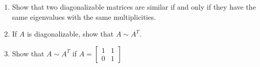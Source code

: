 \documentclass{ximera}
\begin{document}
  \begin{problem}\label{prb:A_sim_A^T_diagonalizable}
  \begin{enumerate}
   
  \item Show that two diagonalizable matrices are similar if and only if they have the same eigenvalues with the same multiplicities.
   
  \item If $A$ is diagonalizable, show that $A \sim A^{T}$.
   
  \item Show that $A \sim A^{T}$ if
   $A = \begin{bmatrix}
   1 & 1 \\
   0 & 1
   \end{bmatrix}$
   
  \end{enumerate}
  \end{problem}
\end{document}
